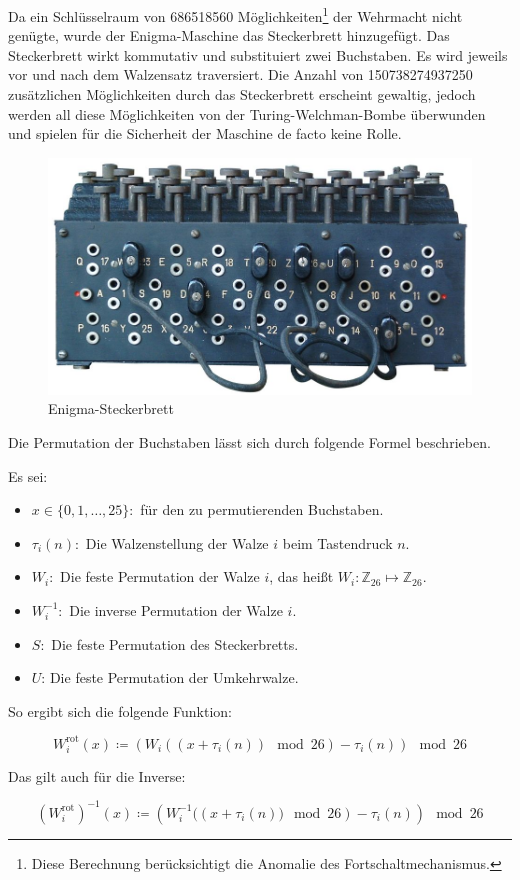 Da ein Schlüsselraum von \num{686518560} Möglichkeiten\footnote{Diese Berechnung berücksichtigt die Anomalie des Fortschaltmechanismus.\autocite{wiki:enigma}} der Wehrmacht nicht genügte, wurde der Enigma-Maschine das Steckerbrett hinzugefügt.
Das Steckerbrett wirkt kommutativ und substituiert zwei Buchstaben. 
Es wird jeweils vor und nach dem Walzensatz traversiert. 
Die Anzahl von \num{150738274937250}\autocite{wiki:enigma} zusätzlichen Möglichkeiten durch das Steckerbrett erscheint gewaltig, jedoch werden all diese Möglichkeiten von der Turing-Welchman-Bombe überwunden und spielen für die Sicherheit der Maschine de facto keine Rolle.

\begin{figure}[htbp]
	\centering
	\includegraphics[width=.4\linewidth]{Enigma/enigma-steckerbrett}
	\caption{Enigma-Steckerbrett\autocite{wiki:enigmasteckerbrett}}
	\label{fig:enigma_plugboard}
\end{figure}

Die Permutation der Buchstaben lässt sich durch folgende Formel beschrieben.

Es sei:
\begin{itemize}
	\item $x \in \{0,1,\ldots,25\}:$ für den zu permutierenden Buchstaben.
	\item $\tau_i(n):$ Die Walzenstellung der Walze $i$ beim Tastendruck $n$.
	\item $W_i:$ Die feste Permutation der Walze $i$, das heißt $W_i: \mathbb{Z}_{26} \longmapsto \mathbb{Z}_{26}$.
	\item $W_i^{-1}:$ Die inverse Permutation der Walze $i$.
	\item $S:$ Die feste Permutation des Steckerbretts.
	\item $U$: Die feste Permutation der Umkehrwalze.
\end{itemize}

So ergibt sich die folgende Funktion:

\[
	W_i^{\mathrm{rot}}(x) \coloneqq \left(W_i\left((x + \tau_i(n)) \mod 26\right) - \tau_i(n)\right) \mod 26
\]

Das gilt auch für die Inverse:

\[
	\left( W_i^{\mathrm{rot}}\right)^{-1} (x) \coloneqq \left(W_i^{-1}(\left(x + \tau_i(n)) \mod 26\right) - \tau_i(n)\right) \mod 26
\]

